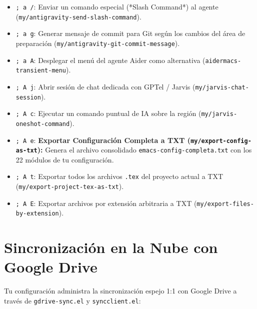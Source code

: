 \documentclass[11pt,book,spanish,alphabetic]{apuntes-scr}
\begin{document}
\begin{itemize}[leftmargin=8mm]
    \item \texttt{; a /}: Enviar un comando especial (*Slash Command*) al agente (\texttt{my/antigravity-send-slash-command}).
    \item \texttt{; a g}: Generar mensaje de commit para Git según los cambios del área de preparación (\texttt{my/antigravity-git-commit-message}).
    \item \texttt{; a A}: Desplegar el menú del agente Aider como alternativa (\texttt{aidermacs-transient-menu}).
    \item \texttt{; A j}: Abrir sesión de chat dedicada con GPTel / Jarvis (\texttt{my/jarvis-chat-session}).
    \item \texttt{; A c}: Ejecutar un comando puntual de IA sobre la región (\texttt{my/jarvis-oneshot-command}).
    \item \texttt{; A e}: \textbf{Exportar Configuración Completa a TXT (\texttt{my/export-config-as-txt}):} Genera el archivo consolidado \texttt{emacs-config-completa.txt} con los 22 módulos de tu configuración.
    \item \texttt{; A t}: Exportar todos los archivos \texttt{.tex} del proyecto actual a TXT (\texttt{my/export-project-tex-as-txt}).
    \item \texttt{; A E}: Exportar archivos por extensión arbitraria a TXT (\texttt{my/export-files-by-extension}).
\end{itemize}

\chapter{Sincronización en la Nube con Google Drive}

Tu configuración administra la sincronización espejo 1:1 con Google Drive a través de \texttt{gdrive-sync.el} y \texttt{syncclient.el}:
\end{document}
